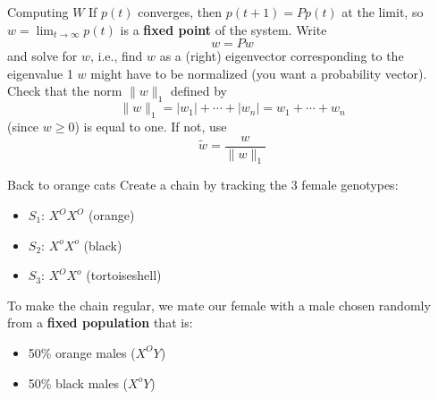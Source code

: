 \documentclass[aspectratio=169]{beamer}\usepackage[]{graphicx}\usepackage[]{xcolor}
\begin{document}
\begin{frame}{Computing $W$}
If $p(t)$ converges, then $p(t+1)=Pp(t)$ at the limit, so $w=\lim_{t\to\infty}p(t)$ is a \textbf{fixed point} of the system. Write
\[
w=Pw
\]
and solve for $w$, i.e., find $w$ as a (right) eigenvector corresponding to the eigenvalue 1
\vfill
$w$ might have to be normalized (you want a probability vector). Check that the norm $\|w\|_1$ defined by
\[
\|w\|_1=|w_1|+\cdots+|w_n|=w_1+\cdots+w_n
\]
(since $w\geq 0$) is equal to one. If not, use
\[
\tilde w = \frac{w}{\|w\|_1}
\]
\end{frame}

\begin{frame}{Back to orange cats}
     Create a chain by tracking the 3 female genotypes:
    \begin{itemize}
        \item $S_1$: $X^O X^O$ (orange)
        \item $S_2$: $X^o X^o$ (black)
        \item $S_3$: $X^O X^o$ (tortoiseshell)
    \end{itemize}
    \vfill
    To make the chain regular, we mate our female with a male chosen randomly from a \textbf{fixed population} that is:
    \begin{itemize}
        \item 50\% orange males ($X^O Y$)
        \item 50\% black males ($X^o Y$)
    \end{itemize}
\end{frame}
\end{document}
